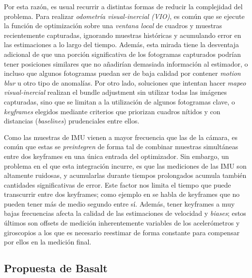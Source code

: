 \documentclass[ twoside,openright,titlepage,numbers=noenddot,%
                headinclude,footinclude,cleardoublepage=empty,abstract=on,
                BCOR=-5mm,paper=a4,fontsize=11pt
                ]{scrreprt}
\begin{document}
Por esta razón, es usual recurrir a distintas formas de reducir la
complejidad del problema. Para realizar \emph{odometría visual-inercial
(VIO)}, es común que se ejecute la función de optimización sobre una
\emph{ventana local} de cuadros y muestras recientemente capturadas,
ignorando muestras históricas y acumulando error en las estimaciones a
lo largo del tiempo. Además, esta mirada tiene la desventaja adicional
de que una porción significativa de los fotogramas capturados podrían
tener posiciones similares que no añadirían demasiada información al
estimador, o incluso que algunos fotogramas puedan ser de baja calidad
por contener \emph{motion blur} u otro tipo de anomalías. Por otro lado,
soluciones que intentan hacer \emph{mapeo visual-inercial} realizan el
bundle adjustment sin utilizar todas las imágenes capturadas, sino que
se limitan a la utilización de algunos fotogramas clave, o
\emph{keyframes} elegidos mediante criterios que priorizan cuadros
nítidos y con distancias (\emph{baselines}) prudenciales entre ellos.

Como las muestras de IMU vienen a mayor frecuencia que las de la cámara,
es común que estas se \emph{preintegren} de forma tal de combinar
muestras simultáneas entre dos keyframes en una única entrada del
optimizador. Sin embargo, un problema en el que esta integración
incurre, es que las mediciones de las IMU son altamente ruidosas, y
acumularlas durante tiempos prolongados acumula también cantidades
significativas de error. Este factor nos limita el tiempo que puede
transcurrir entre dos keyframes; como ejemplo en
\textcite{mur-artalVisualInertialMonocularSLAM2017} se habla de
keyframes que no pueden tener más de medio segundo entre sí. Además,
tener keyframes a muy bajas frecuencias afecta la calidad de las
estimaciones de velocidad y \emph{biases}; estos últimos son offsets de
medición inherentemente variables de los acelerómetros y giroscopios a
los que es necesario reestimar de forma constante para compensar por
ellos en la medición final.

\hypertarget{propuesta-de-basalt}{%
\subsection{Propuesta de Basalt}\label{propuesta-de-basalt}}
\end{document}
